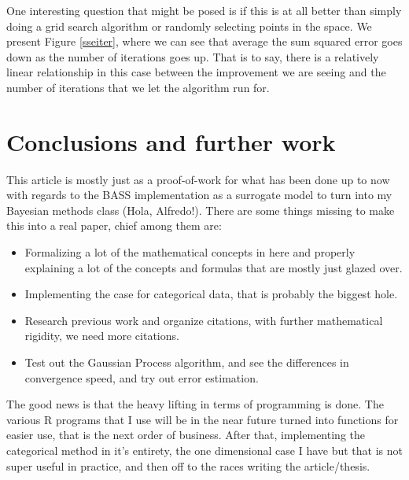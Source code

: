 \documentclass[%
 aip,
 amsmath,amssymb,
 reprint,%
]{revtex4-1}
\begin{document}
One interesting question that might be posed is if this is at all better than simply doing a grid search algorithm or randomly selecting points in the space. We present Figure \ref{sseiter}, where we can see that average the sum squared error goes down as the number of iterations goes up. That is to say, there is a relatively linear relationship in this case between the improvement we are seeing and the number of iterations that we let the algorithm run for. 

\section{Conclusions and further work}

This article is mostly just as a proof-of-work for what has been done up to now with regards to the BASS implementation as a surrogate model to turn into my Bayesian methods class (Hola, Alfredo!). There are some things missing to make this into a real paper, chief among them are: 
\begin{itemize}
	\item Formalizing a lot of the mathematical concepts in here and properly explaining a lot of the concepts and formulas that are mostly just glazed over.
	\item Implementing the case for categorical data, that is probably the biggest hole. 
	\item Research previous work and organize citations, with further mathematical rigidity, we need more citations. 
	\item Test out the Gaussian Process algorithm, and see the differences in convergence speed, and try out error estimation. 
\end{itemize}

The good news is that the heavy lifting in terms of programming is done. The various R programs that I use will be in the near future turned into functions for easier use, that is the next order of business. After that, implementing the categorical method in it's entirety, the one dimensional case I have but that is not super useful in practice, and then off to the races writing the article/thesis. 

\nocite{*}
\end{document}
